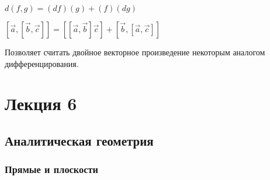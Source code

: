 \documentclass{book}
\theoremstyle{definition}
\begin{document}
$d(f,g) = (df)(g) + (f)(dg)$

 $\left[ \vec a, \left[ \vec b, \vec c \right]  \right]  = \left[ \left[ \vec a, \vec b \right] \vec c \right] +\left[ \vec b, \left[ \vec a, \vec c \right]  \right] $

 Позволяет считать двойное векторное произведение некоторым аналогом дифференцирования.
 \section{Лекция 6}

 \subsection{Аналитическая геометрия}
 \subsubsection{Прямые и плоскости}
\end{document}
